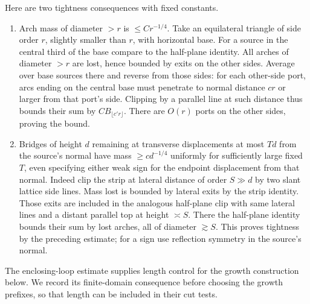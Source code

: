 Here are two tightness consequences with fixed constants.
\begin{enumerate}
\item Arch mass of diameter \(>r\) is \(\le C r^{-1/4}\). Take an equilateral triangle of side order \(r\), slightly smaller than \(r\), with horizontal base. For a source in the central third of the base compare to the half-plane identity. All arches of diameter \(>r\) are lost, hence bounded by exits on the other sides. Average over base sources there and reverse from those sides: for each other-side port, arcs ending on the central base must penetrate to normal distance \(c r\) or larger from that port's side. Clipping by a parallel line at such distance thus bounds their sum by \(C B_{\lfloor c'r\rfloor}\). There are \(O(r)\) ports on the other sides, proving the bound.
\item Bridges of height \(d\) remaining at transverse displacements at most \(Td\) from the source's normal have mass \(\ge c d^{-1/4}\) uniformly for sufficiently large fixed \(T\), even specifying either weak sign for the endpoint displacement from that normal. Indeed clip the strip at lateral distance of order \(S\gg d\) by two slant lattice side lines. Mass lost is bounded by lateral exits by the strip identity. Those exits are included in the analogous half-plane clip with same lateral lines and a distant parallel top at height \(\asymp S\). There the half-plane identity bounds their sum by lost arches, all of diameter \(\gtrsim S\). This proves tightness by the preceding estimate; for a sign use reflection symmetry in the source's normal.
\end{enumerate}

The enclosing-loop estimate supplies length control for the growth
construction below. We record its finite-domain consequence before choosing
the growth prefixes, so that length can be included in their cut tests.

